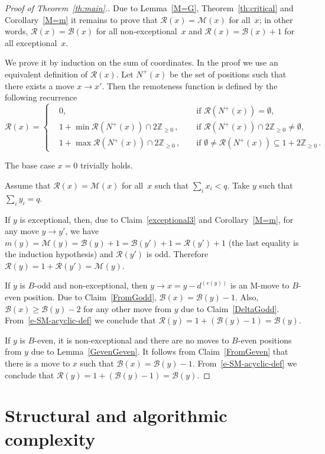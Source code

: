 \documentclass{article}
\theoremstyle{definition}
\def\mv#1{d^{(#1)}}
\def\B{\mathcal{B}}
\def\R{\mathcal{R}}
\def\M{\mathcal{M}}
\def\ZZ{\mathbb{Z}}
\begin{document}
\begin{proof}[Proof of Theorem~\ref{th:main}.]
  Due to Lemma~\ref{M=G}, Theorem~\ref{th:critical} and Corollary~\ref{M=m} it remains to prove that $\R(x) = \M(x)$ for all~$x$; in other words, $\R(x) = \B(x)$ for all non-exceptional~$x$ and $\R(x) = \B(x)+1$ for all exceptional~$x$.

  We prove it by induction on the sum of coordinates. In the proof we use an equivalent definition of $\R(x)$. Let $N^+(x)$ be the set of positions such that there exists a move $x\to x'$. 
Then  the remoteness function is defined by the following  recurrence
\begin{equation}\label{e-SM-acyclic-def}
\R(x) =\left\{
\begin{aligned}
&0,  &&\text{ if } \R(N^+(x))=\emptyset,\\
&1+ \min \R(N^+(x))\cap 2\ZZ_{\geq0}\,, && \text{ if } \R(N^+(x))\cap 2\ZZ_{\geq0} \neq \emptyset,\\
&1+ \max \R(N^+(x))\cap 2\ZZ_{\geq0}\,, && \text{ if } \emptyset \neq \R(N^+(x))\subseteq 1+2\ZZ_{\geq0}\,.
\end{aligned}\right. 
\end{equation}

The base case $x=0$ trivially holds.

Assume that $\R(x) = \M(x)$ for all~$x$ such that $\sum_i x_i< q$. Take $y$ such that $\sum_i y_i = q$.

If $y$ is exceptional, then, due to Claim~\ref{exceptional3} and Corollary~\ref{M=m}, for any move $y\to y'$, we have $m(y) = \M(y) = \B(y)+1 = \B(y')+1 = \R(y')+1$ (the last equality is the induction hypothesis) and $\R(y')$ is odd. Therefore $\R(y) = 1+\R(y') = \M(y)$.

If $y$ is $B$-odd and non-exceptional, then $y\to x= y-\mv{e(y)}$ is an M-move to $B$-even position. Due to Claim~\ref{FromGodd}, $\B(x) = \B(y)-1$. Also, $\B(x)\geq \B(y)-2$ for any other move from $y$ due to Claim~\ref{DeltaGodd}. From~\eqref{e-SM-acyclic-def} we conclude that $\R(y) = 1+ (\B(y)-1)= \B(y) $. 

If $y$ is $B$-even, it is  non-exceptional  and there are no moves to $B$-even positions from $y$ due to Lemma~\ref{GevenGeven}. It follows from Claim~\ref{FromGeven} that there is a move to $x$ such that $\B(x) = \B(y)-1$. 
From~\eqref{e-SM-acyclic-def} we conclude that $\R(y) = 1+ (\B(y)-1)= \B(y) $. 
\end{proof}

\section{Structural and algorithmic complexity}
\end{document}
